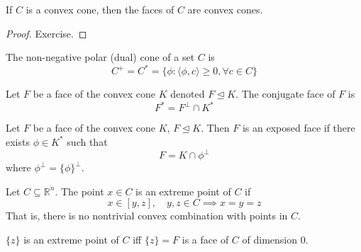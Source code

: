 \begin{theorem}[]
    If $C$ is a convex cone, then the faces of $C$ are convex cones.
\end{theorem}
\begin{proof}[Proof]
    Exercise.
\end{proof}
\begin{definition}
    The non-negative polar (dual) cone of a set $C$ is
    $$C^+ = C^* = \{\phi : \langle \phi, c \rangle \geq 0, \forall c \in C\}$$
\end{definition}
\begin{definition}
    Let $F$ be a face of the convex cone $K$ denoted $F \unlhd K$. The conjugate face of $F$ is $$F^* = F^\bot \cap K^*$$
\end{definition}
\begin{definition}
    Let $F$ be a face of the convex cone $K$, $F \unlhd K$. Then $F$ is an exposed face if there exists $\phi \in K^*$ such that
    $$F = K \cap \phi^\bot$$
    where $\phi^\bot = \{\phi\}^\bot$.
\end{definition}
\begin{definition}
    Let $C \subseteq \mathbb R^n$. The point $x \in C$ is an extreme point of $C$ if
    $$x \in [y,z], \quad y, z \in C \implies x = y = z$$
    That is, there is no nontrivial convex combination with points in $C$.
\end{definition}
\begin{theorem}[]
    $\{z\}$ is an extreme point of $C$ iff $\{z\} = F$ is a face of $C$ of dimension 0.
\end{theorem}
